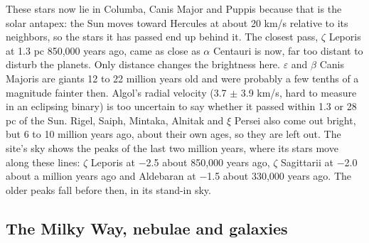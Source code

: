 \documentclass[9pt,twocolumn]{extarticle}
\begin{document}
These stars now lie in Columba, Canis Major and Puppis because that is the solar antapex: the Sun moves toward Hercules at about 20 km/s relative to its neighbors, so the stars it has passed end up behind it. The closest pass, $\zeta$ Leporis at 1.3 pc 850,000 years ago, came as close as $\alpha$ Centauri is now, far too distant to disturb the planets. Only distance changes the brightness here. $\varepsilon$ and $\beta$ Canis Majoris are giants 12 to 22 million years old and were probably a few tenths of a magnitude fainter then. Algol's radial velocity (3.7 $\pm$ 3.9 km/s, hard to measure in an eclipsing binary) is too uncertain to say whether it passed within 1.3 or 28 pc of the Sun. Rigel, Saiph, Mintaka, Alnitak and $\xi$ Persei also come out bright, but 6 to 10 million years ago, about their own ages, so they are left out. The site's sky shows the peaks of the last two million years, where its stars move along these lines: $\zeta$ Leporis at $-$2.5 about 850,000 years ago, $\zeta$ Sagittarii at $-$2.0 about a million years ago and Aldebaran at $-$1.5 about 330,000 years ago. The older peaks fall before then, in its stand-in sky.


\subsection{The Milky Way, nebulae and galaxies}\label{the-milky-way-nebulae-and-galaxies}
\end{document}
